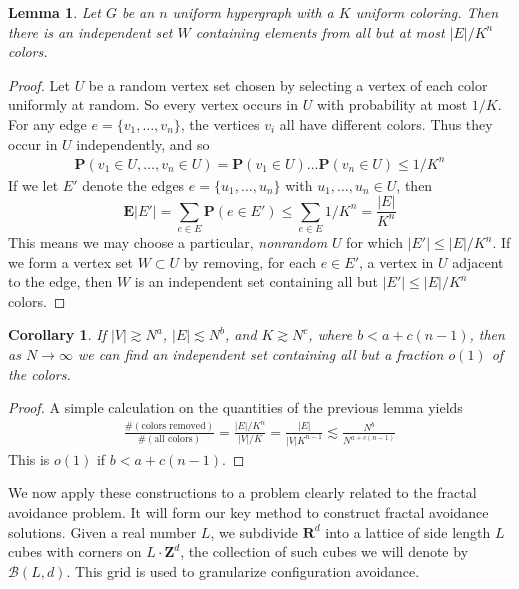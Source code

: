 \documentclass{article}
\theoremstyle{plain}
\newtheorem{lemma}{Lemma}
\newtheorem*{corollary}{Corollary}
\theoremstyle{plain}
\begin{document}
\begin{multicols}{2}
\begin{lemma}
	Let $G$ be an $n$ uniform hypergraph with a $K$ uniform coloring. Then there is an independent set $W$ containing elements from all but at most $|E|/K^n$ colors.
\end{lemma}
\begin{proof}
	Let $U$ be a random vertex set chosen by selecting a vertex of each color uniformly at random. So every vertex occurs in $U$ with probability at most $1/K$. For any edge $e = \{ v_1, \dots, v_n \}$, the vertices $v_i$ all have different colors. Thus they occur in $U$ independently, and so
	\begin{align*}
		\mathbf{P}(v_1 \in U, \dots, v_n \in U) = \mathbf{P}(v_1 \in U) \dots \mathbf{P}(v_n \in U) \leq 1/K^n
	\end{align*}
	If we let $E'$ denote the edges $e = \{ u_1, \dots, u_n \}$ with $u_1, \dots, u_n \in U$, then
	\[ \mathbf{E}|E'| = \sum_{e \in E} \mathbf{P}(e \in E') \leq \sum_{e \in E} 1/K^n = \frac{|E|}{K^n} \]
	This means we may choose a particular, {\it nonrandom} $U$ for which $|E'| \leq |E|/K^n$. If we form a vertex set $W \subset U$ by removing, for each $e \in E'$, a vertex in $U$ adjacent to the edge, then $W$ is an independent set containing all but $|E'| \leq |E|/K^n$ colors.
\end{proof}

\begin{corollary}
	If $|V| \gtrsim N^a$, $|E| \lesssim N^b$, and $K \gtrsim N^c$, where $b < a + c(n-1)$, then as $N \to \infty$ we can find an independent set containing all but a fraction $o(1)$ of the colors.
\end{corollary}
\begin{proof}
	A simple calculation on the quantities of the previous lemma yields
	\begin{align*}
		\frac{\# ( \text{colors removed} )}{\# ( \text{all colors} )} = \frac{|E|/K^n}{|V|/K} = \frac{|E|}{|V|K^{n-1}} \lesssim \frac{N^b}{N^{a + c(n-1)}}
	\end{align*}
	This is $o(1)$ if $b < a + c(n-1)$.
\end{proof}

We now apply these constructions to a problem clearly related to the fractal avoidance problem. It will form our key method to construct fractal avoidance solutions. Given a real number $L$, we subdivide $\mathbf{R}^d$ into a lattice of side length $L$ cubes with corners on $L \cdot \mathbf{Z}^d$, the collection of such cubes we will denote by $\mathcal{B}(L,d)$. This grid is used to granularize configuration avoidance.


\end{multicols}
\end{document}

